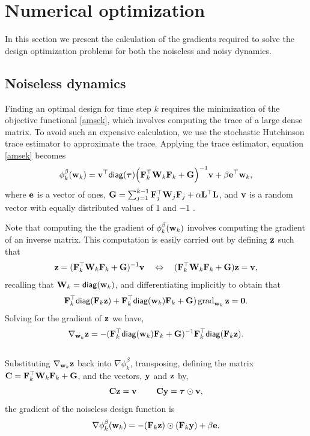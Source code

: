 \documentclass[leqno,onefignum,onetabnum]{siamltexmm}
\newcommand{\bfC}	{{\bf{C}}}
\newcommand{\bfF}	{{\bf{F}}}
\newcommand{\bfG}	{{\bf{G}}}
\newcommand{\bfL}	{{\bf{L}}}
\newcommand{\bfW}	{{\bf{W}}}
\newcommand{\bfe}	{{\bf{e}}}
\newcommand{\bfv}	{{\bf{v}}}
\newcommand{\bfw}	{{\bf{w}}}
\newcommand{\bfy}	{{\bf{y}}}
\newcommand{\bfz}	{{\bf{z}}}
\newcommand{\bftau}      {{\boldsymbol \tau}}
\newcommand {\zero}  {{\bf 0}}
\newcommand{\LtL}       { \bfL^{\top}\bfL}
\begin{document}
\section{Numerical optimization}
\label{sec:Opt}
In this section we present the calculation of the gradients required to solve the design optimization problems for both the noiseless and noisy dynamics. 
\subsection{Noiseless dynamics}
Finding an optimal design for  time step $k$ requires the minimization of the objective functional \eqref{amsek}, which involves computing the trace of a large dense matrix. To avoid such an expensive calculation, we use the stochastic Hutchinson trace estimator to approximate the trace. Applying the trace estimator, equation \eqref{amsek} becomes
\begin{equation*}
\phi_k^{\beta}(\bfw_k) = \bfv^{\top}{\sf diag}(\bftau) \Big(\bfF_k^{\top}\bfW_k\bfF_k   + \bfG \Big)^{-1}\bfv + \beta\bfe^{\top}\bfw_k,
\end{equation*}
where $\bfe$ is a vector of ones, $\bfG = \sum_{j=1}^{k-1}\bfF_{j}^{\top}\bfW_{j}\bfF_{j}+ \alpha\LtL$, and $\bfv$ is a random vector with equally distributed values of $1$ and $-1$ \cite{Hutchinson1990,Haber2011}. 


Note that computing the the gradient of $\phi_k^{\beta}(\bfw_k)$ involves computing the gradient of an inverse matrix.
This computation is easily carried out by defining $\bfz$ such that
\begin{equation}
\label{eq:z}
\bfz = (\bfF_k^{\top}\bfW_k\bfF_k   + \bfG)^{-1}\bfv \quad \Leftrightarrow \quad
(\bfF_k^{\top}\bfW_k\bfF_k   + \bfG)\bfz = \bfv,
\end{equation}
  recalling that $\bfW_k = {\sf diag}(\bfw_k)$, and differentiating implicitly to obtain that
\begin{equation*}
\bfF_k^{\top}{\sf diag}(\bfF_k\bfz) + \bfF_k^{\top}{\sf diag}(\bfw_k)\bfF_k +\bfG)\grad_{\bfw_k}\bfz =\zero.
\end{equation*}
Solving for the gradient of $\bfz$ we have,
\begin{equation*}
\nabla_{\bfw_k}\bfz = -(\bfF_k^{\top}{\sf diag}(\bfw_k)\bfF_k +\bfG)^{-1} \bfF_k^{\top}{\sf diag}(\bfF_k\bfz).
\end{equation*}
\\
Substituting $\nabla_{\bfw_k}\bfz$ back into $\nabla\phi_k^{\beta}$, transposing, defining the matrix $\bfC = \bfF_k^{\top}\bfW_k\bfF_k   + \bfG$, and the vectors, $\bfy$ and $\bfz$ by, 
$$\bfC\bfz = \bfv\ \quad \quad \bfC\bfy =\bftau\odot\bfv, $$ 
the gradient of the noiseless design function is
\begin{equation}
\nabla\phi_k^{\beta}(\bfw_k) =  -(\bfF_k\bfz)\odot(\bfF_k\bfy) + \beta\bfe.
\end{equation}
\end{document}
